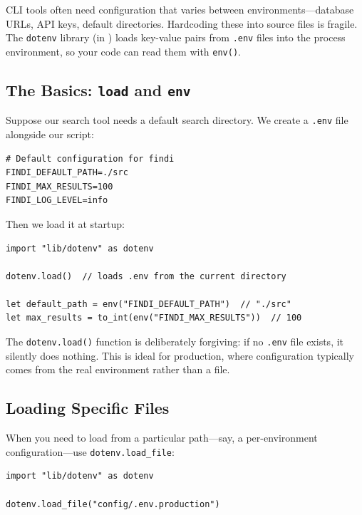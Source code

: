 
CLI tools often need configuration that varies between environments---database URLs, API keys, default directories.
Hardcoding these into source files is fragile.
The \lstinline|dotenv| library (in ) loads key-value pairs from \texttt{.env} files into the process environment, so your code can read them with \lstinline|env()|.

\subsection{The Basics: \texttt{load} and \texttt{env}}\label{sec:dotenv-basics}

Suppose our search tool needs a default search directory.
We create a \texttt{.env} file alongside our script:

\begin{lstlisting}[language={}, caption={A \texttt{.env} file}]
# Default configuration for findi
FINDI_DEFAULT_PATH=./src
FINDI_MAX_RESULTS=100
FINDI_LOG_LEVEL=info
\end{lstlisting}

Then we load it at startup:

\begin{lstlisting}[language=Lattice, caption={Loading a .env file}]
import "lib/dotenv" as dotenv

dotenv.load()  // loads .env from the current directory

let default_path = env("FINDI_DEFAULT_PATH")  // "./src"
let max_results = to_int(env("FINDI_MAX_RESULTS"))  // 100
\end{lstlisting}

The \lstinline|dotenv.load()| function is deliberately forgiving: if no \texttt{.env} file exists, it silently does nothing.
This is ideal for production, where configuration typically comes from the real environment rather than a file.

\subsection{Loading Specific Files}\label{sec:dotenv-load-file}


When you need to load from a particular path---say, a per-environment configuration---use \lstinline|dotenv.load_file|:

\begin{lstlisting}[language=Lattice, caption={Loading a specific .env file}]
import "lib/dotenv" as dotenv

dotenv.load_file("config/.env.production")
\end{lstlisting}

